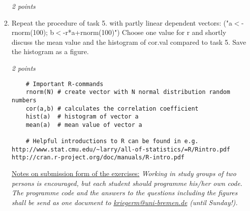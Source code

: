 \documentclass[a4paper,12pt]{article}
\begin{document}
\begin{enumerate}
\textit{ 2 points} \\[2ex]


\item Repeat the procedure of task 5. with partly linear dependent vectors:
("a$<$-rnorm(100); b$<$-r*a+rnorm(100)")
Choose one value for r and shortly discuss the mean value and the histogram of cor.val compared to task 5. Save the histogram as a figure.

\textit{ 2 points} \\[2ex]




\begin{verbatim}
	# Important R-commands
	rnorm(N) # create vector with N normal distribution random numbers
	cor(a,b) # calculates the correlation coefficient
	hist(a)  # histogram of vector a 
	mean(a)  # mean value of vector a

	# Helpful introductions to R can be found in e.g.
http://www.stat.cmu.edu/~larry/all-of-statistics/=R/Rintro.pdf
http://cran.r-project.org/doc/manuals/R-intro.pdf
\end{verbatim}
\underline{Notes on submission form of the exercises:}
 \textit{Working in study groups of two persons is encouraged, but each student should programme his/her own code.
The programme code and the answers to the questions including the figures shall be send as one document to \url{kriegerm@uni-bremen.de} (until Sunday!).
}

\end{enumerate}
\end{document}
